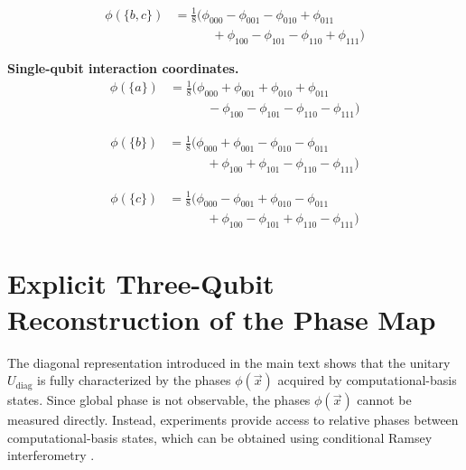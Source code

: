 \begin{equation}
\boxed{
\begin{aligned}
\phi(\{b,c\})
&= \frac{1}{8}\Big(
\phi_{000}
-\phi_{001}
-\phi_{010}
+\phi_{011} \\
&\qquad\quad
+\phi_{100}
-\phi_{101}
-\phi_{110}
+\phi_{111}
\Big)
\end{aligned}
}
\end{equation}

\medskip
\noindent\textbf{Single-qubit interaction coordinates.}
\begin{equation}
\boxed{
\begin{aligned}
\phi(\{a\})
&= \frac{1}{8}\Big(
\phi_{000}
+\phi_{001}
+\phi_{010}
+\phi_{011} \\
&\qquad\quad
-\phi_{100}
-\phi_{101}
-\phi_{110}
-\phi_{111}
\Big)
\end{aligned}
}
\end{equation}

\begin{equation}
\boxed{
\begin{aligned}
\phi(\{b\})
&= \frac{1}{8}\Big(
\phi_{000}
+\phi_{001}
-\phi_{010}
-\phi_{011} \\
&\qquad\quad
+\phi_{100}
+\phi_{101}
-\phi_{110}
-\phi_{111}
\Big)
\end{aligned}
}
\end{equation}

\begin{equation}
\boxed{
\begin{aligned}
\phi(\{c\})
&= \frac{1}{8}\Big(
\phi_{000}
-\phi_{001}
+\phi_{010}
-\phi_{011} \\
&\qquad\quad
+\phi_{100}
-\phi_{101}
+\phi_{110}
-\phi_{111}
\Big)
\end{aligned}
}
\end{equation}


\section{Explicit Three-Qubit Reconstruction of the Phase Map}
\label{app:explicit_3q_phase_map_reconstruction}

\noindent
The diagonal representation introduced in the main text shows that the unitary $U_{\mathrm{diag}}$ is fully characterized by the phases $\phi(\vec{x})$ acquired by computational-basis states. Since global
phase is not observable, the phases $\phi(\vec{x})$ cannot be measured directly. Instead, experiments provide access to relative phases between computational-basis states, which can be obtained using conditional
Ramsey interferometry \cite{ramsey1950molecular, childress2006coherent, balasubramanian2009ultralong, taminiau2014universal}.


